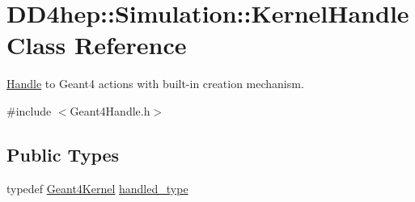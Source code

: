 \hypertarget{class_d_d4hep_1_1_simulation_1_1_kernel_handle}{}\section{D\+D4hep\+:\+:Simulation\+:\+:Kernel\+Handle Class Reference}
\label{class_d_d4hep_1_1_simulation_1_1_kernel_handle}


\hyperlink{class_d_d4hep_1_1_handle}{Handle} to Geant4 actions with built-\/in creation mechanism.  




{\ttfamily \#include $<$Geant4\+Handle.\+h$>$}

\subsection*{Public Types}
\begin{DoxyCompactItemize}
\item 
typedef \hyperlink{class_d_d4hep_1_1_simulation_1_1_geant4_kernel}{Geant4\+Kernel} \hyperlink{class_d_d4hep_1_1_simulation_1_1_kernel_handle_ab3846addea4978dab36bdb0cfb53dc34}{handled\+\_\+type}
\end{DoxyCompactItemize}
